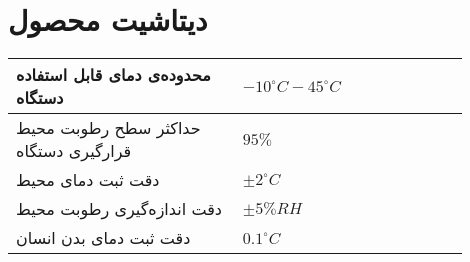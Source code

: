 \chapter{دیتاشیت محصول}



\begin{table}[ht!]
	\begin{tabular}{|p{0.45\linewidth}|p{0.45\linewidth}|}
		\hline		
				محدوده‌ی دمای قابل استفاده دستگاه
		&    $-10 ^\circ C - 45 ^\circ C$
		\\ \hline
		حداکثر سطح رطوبت محیط قرارگیری دستگاه 
		&   
		$		95\%$		
		\\ \hline
		دقت ثبت دمای محیط     &
		$\pm2 ^\circ C$
		 \\ \hline
		دقت اندازه‌گیری رطوبت محیط &   
				$\pm5\%RH$
		 \\ \hline
		 دقت ثبت دمای بدن انسان
&
$ 0.1 ^\circ C$
		 \\ \hline
	\end{tabular}
\end{table}